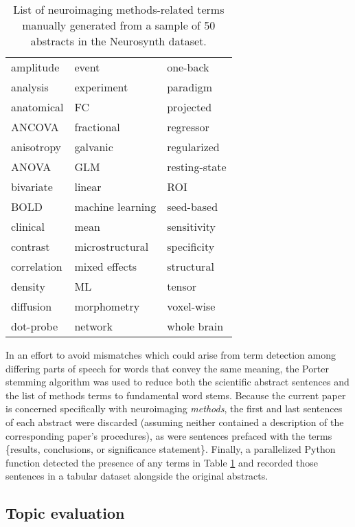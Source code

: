 \begin{table}[]
	\begin{tabular}{lll}
		amplitude   & event            & one-back      \\
		analysis    & experiment       & paradigm      \\
		anatomical  & FC               & projected     \\
		ANCOVA      & fractional       & regressor     \\
		anisotropy  & galvanic         & regularized   \\
		ANOVA       & GLM              & resting-state \\
		bivariate   & linear           & ROI           \\
		BOLD        & machine learning & seed-based    \\
		clinical    & mean             & sensitivity   \\
		contrast    & microstructural  & specificity   \\
		correlation & mixed effects    & structural    \\
		density     & ML               & tensor        \\
		diffusion   & morphometry      & voxel-wise    \\
		dot-probe   & network          & whole brain  
	\end{tabular}
	\caption{List of neuroimaging methods-related terms manually generated from a sample of 50 abstracts in the Neurosynth dataset.}
	\label{tab:corpus}
\end{table}

In an effort to avoid mismatches which could arise from term detection among differing parts of speech for words that convey the same meaning, the Porter stemming algorithm \cite{M.F.Porter1980} was used to reduce both the scientific abstract sentences and the list of methods terms to fundamental word stems. Because the current paper is concerned specifically with neuroimaging \emph{methods}, the first and last sentences of each abstract were discarded (assuming neither contained a description of the corresponding paper's procedures), as were sentences prefaced with the terms \{results, conclusions, or significance statement\}. Finally, a parallelized Python function detected the presence of any terms in Table \ref{tab:corpus} and recorded those sentences in a tabular dataset alongside the original abstracts. 

\subsection{Topic evaluation}

